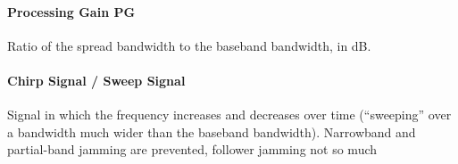 \paragraph{Processing Gain PG}
Ratio of the spread bandwidth to the baseband bandwidth, in dB.


\paragraph{Chirp Signal / Sweep Signal}
Signal in which the frequency increases and decreases over time (``sweeping'' over a bandwidth much wider than the baseband bandwidth).
Narrowband and partial-band jamming are prevented, follower jamming not so much
